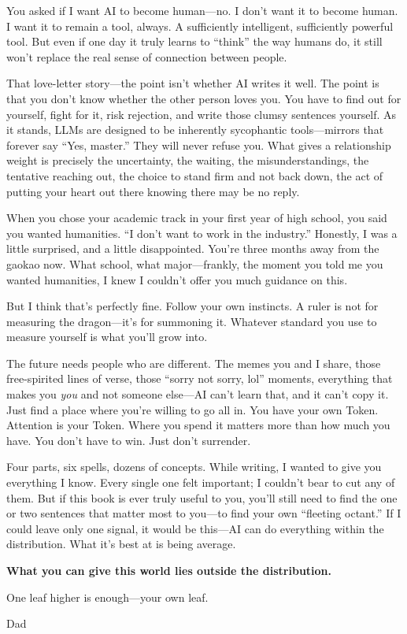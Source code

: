 \vspace{1em}

You asked if I want AI to become human---no.
I don't want it to become human. I want it to remain a tool, always. A sufficiently intelligent, sufficiently powerful tool.
But even if one day it truly learns to ``think'' the way humans do, it still won't replace the real sense of connection between people.

\newpage
That love-letter story---the point isn't whether AI writes it well. The point is that you don't know whether the other person loves you. You have to find out for yourself, fight for it, risk rejection, and write those clumsy sentences yourself. As it stands, LLMs are designed to be inherently sycophantic tools---mirrors that forever say ``Yes, master.'' They will never refuse you. What gives a relationship weight is precisely the uncertainty, the waiting, the misunderstandings, the tentative reaching out, the choice to stand firm and not back down, the act of putting your heart out there knowing there may be no reply.

\vspace{1em}

When you chose your academic track in your first year of high school, you said you wanted humanities. ``I don't want to work in the industry.'' Honestly, I was a little surprised, and a little disappointed.
You're three months away from the gaokao now. What school, what major---frankly, the moment you told me you wanted humanities, I knew I couldn't offer you much guidance on this.

But I think that's perfectly fine. Follow your own instincts. A ruler is not for measuring the dragon---it's for summoning it. Whatever standard you use to measure yourself is what you'll grow into.


The future needs people who are different. The memes you and I share, those free-spirited lines of verse, those ``sorry not sorry, lol'' moments, everything that makes you \emph{you} and not someone else---AI can't learn that, and it can't copy it. Just find a place where you're willing to go all in. You have your own Token. Attention is your Token. Where you spend it matters more than how much you have. You don't have to win. Just don't surrender.

\vspace{1em}

Four parts, six spells, dozens of concepts. While writing, I wanted to give you everything I know. Every single one felt important; I couldn't bear to cut any of them. But if this book is ever truly useful to you, you'll still need to find the one or two sentences that matter most to you---to find your own ``fleeting octant.''
If I could leave only one signal, it would be this---AI can do everything within the distribution. What it's best at is being average.

\vspace{1em}

\textbf{What you can give this world lies outside the distribution.}

One leaf higher is enough---your own leaf.

\vspace{2em}
\begin{flushright}
Dad
\end{flushright}
